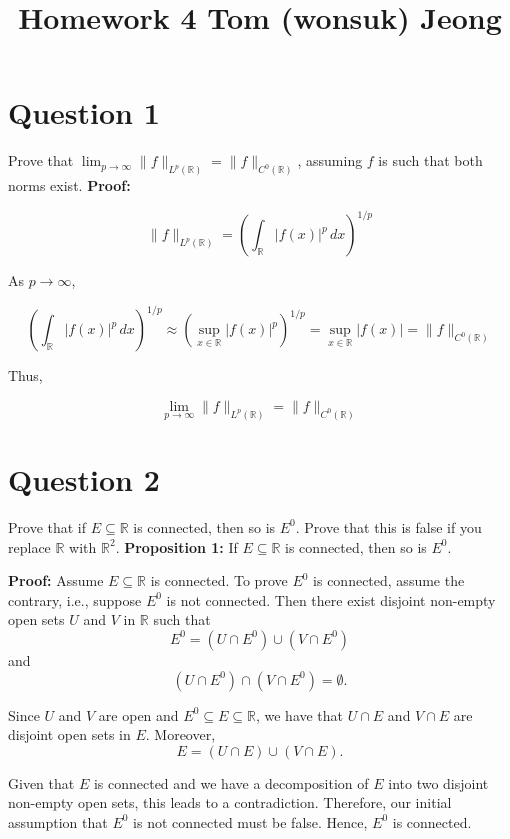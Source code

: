 \documentclass{article}
\begin{document}

\title{Homework 4 Tom (wonsuk) Jeong  }
\maketitle

\section{Question 1}
Prove that \(\lim_{p \to \infty} \|f\|_{L^p(\mathbb{R})} = \|f\|_{C^0(\mathbb{R})}\), assuming \(f\) is such
that both norms exist.
\textbf{Proof:}

\[
\|f\|_{L^p(\mathbb{R})} = \left( \int_{\mathbb{R}} |f(x)|^p \, dx \right)^{1/p}
\]

As \(p \to \infty\),

\[
\left( \int_{\mathbb{R}} |f(x)|^p \, dx \right)^{1/p} \approx \left( \sup_{x \in \mathbb{R}} |f(x)|^p \right)^{1/p} = \sup_{x \in \mathbb{R}} |f(x)| = \|f\|_{C^0(\mathbb{R})}
\]

Thus,

\[
\lim_{p \to \infty} \|f\|_{L^p(\mathbb{R})} = \|f\|_{C^0(\mathbb{R})}
\]

\section{Question 2} Prove that if \(E \subseteq \mathbb{R}\) is connected, then so is \(E^0\). Prove that
this is false if you replace \(\mathbb{R}\) with \(\mathbb{R}^2\).
\textbf{Proposition 1:} If \( E \subseteq \mathbb{R} \) is connected, then so is \( E^0 \).

\textbf{Proof:} Assume \( E \subseteq \mathbb{R} \) is connected. To prove \( E^0 \) is connected, assume the contrary, i.e., suppose \( E^0 \) is not connected. Then there exist disjoint non-empty open sets \( U \) and \( V \) in \( \mathbb{R} \) such that
\[
E^0 = (U \cap E^0) \cup (V \cap E^0)
\]
and
\[
(U \cap E^0) \cap (V \cap E^0) = \emptyset.
\]

Since \( U \) and \( V \) are open and \( E^0 \subseteq E \subseteq \mathbb{R} \), we have that \( U \cap E \) and \( V \cap E \) are disjoint open sets in \( E \). Moreover,
\[
E = (U \cap E) \cup (V \cap E).
\]

Given that \( E \) is connected and we have a decomposition of \( E \) into two disjoint non-empty open sets, this leads to a contradiction. Therefore, our initial assumption that \( E^0 \) is not connected must be false. Hence, \( E^0 \) is connected.
\end{document}
